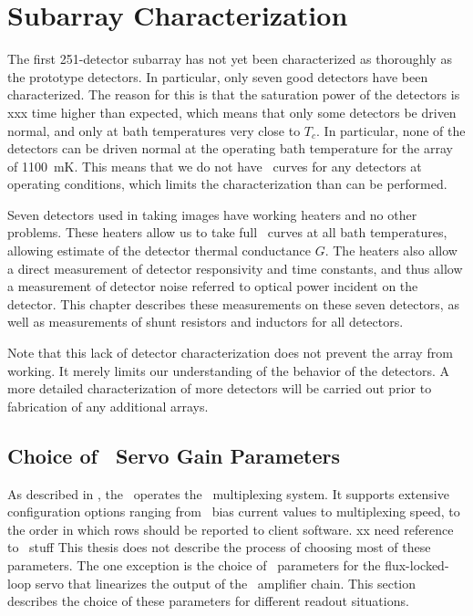 \chapter{Subarray Characterization}\label{c:det-array}

The first 251-detector subarray has not yet been characterized as thoroughly as the prototype detectors.
In particular, only seven good detectors have been characterized.
The reason for this is that the saturation power of the detectors is xxx time higher than expected, which means that only some detectors be driven normal, and only at bath temperatures very close to $T_c$.
In particular, none of the detectors can be driven normal at the operating bath temperature for the array of 1100~mK.
This means that we do not have \IV\ curves for any detectors at operating conditions, which limits the characterization than can be performed.

Seven detectors used in taking images have working heaters and no other problems.
These heaters allow us to take full \IV\ curves at all bath temperatures, allowing estimate of the detector thermal conductance $G$.
The heaters also allow a direct measurement of detector responsivity and time constants, and thus allow a measurement of detector noise referred to optical power incident on the detector.
This chapter describes these measurements on these seven detectors, as well as measurements of shunt resistors and inductors for all detectors.

Note that this lack of detector characterization does not prevent the array from working.
It merely limits our understanding of the behavior of the detectors.
A more detailed characterization of more detectors will be carried out prior to fabrication of any additional arrays.

\section{Choice of \MCE\ Servo Gain Parameters}

As described in , the \MCE\ operates the \SQUID\ multiplexing system.
It supports extensive configuration options ranging from \SQUID\ bias current values to multiplexing speed, to the order in which rows should be reported to client software. xx need reference to \MCE\ stuff
This thesis does not describe the process of choosing most of these parameters.
The one exception is the choice of \PID\ parameters for the flux-locked-loop servo that linearizes the output of the \SQUID\ amplifier chain.
This section describes the choice of these parameters for different readout situations.

